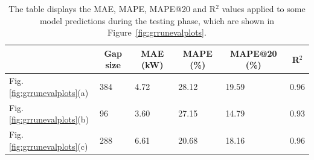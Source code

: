 \begin{table}[H]
	\begin{center}
		\begin{tabular}[c]{l|l|l|l|l|l}
			                                           &
			\multicolumn{1}{c|}{\textbf{Gap size}}     &
			\multicolumn{1}{c|}{\textbf{MAE (kW)}}     &
			\multicolumn{1}{c|}{\textbf{MAPE (\%)}}    &
			\multicolumn{1}{c|}{\textbf{MAPE@20 (\%)}} &
			\multicolumn{1}{c}{\textbf{R}$^2$}                                             \\
			\hline

			Fig. \ref{fig:grrunevalplots}(a)           & 384 & 4.72 & 28.12 & 19.59 & 0.96 \\
			Fig. \ref{fig:grrunevalplots}(b)           & 96  & 3.60 & 27.15 & 14.79 & 0.93 \\
			Fig. \ref{fig:grrunevalplots}(c)           & 288 & 6.61 & 20.68 & 18.16 & 0.96
		\end{tabular}
	\end{center}
	\caption{The table displays the MAE, MAPE, MAPE@20 and R$^2$ values applied to some model predictions during the testing phase, which are shown in Figure~\ref{fig:grrunevalplots}.
	}\label{tab:grrunpmaer}
\end{table}



